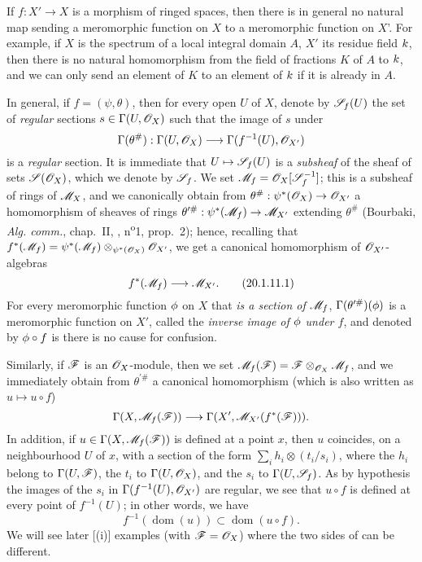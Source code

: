 \begin{env}[20.1.11]
\label{IV.20.1.11}
If $f:X'\to X$ is a morphism of ringed spaces, then there is in general no natural map sending a meromorphic function on $X$ to a meromorphic function on $X$'.
For example, if $X$ is the spectrum of a local integral domain $A$, $X'$ its residue field $k$, then there is no natural homomorphism from the field of fractions $K$ of $A$ to $k$, and we can only send an element of $K$ to an element of $k$ if it is already in $A$.

In general, if $f=(\psi,\theta)$, then for every open $U$ of $X$, denote by $\mathscr{S}_f(U)$ the set of \emph{regular} sections $s\in\Gamma(U,\mathscr{O}_X)$ such that the image of $s$ under
\[
  \Gamma(\theta^\#):\Gamma(U,\sh{O}_X)\to\Gamma(f^{-1}(U),\sh{O}_{X'})
\]
is a \emph{regular} section.
It is immediate that $U\mapsto\sh{S}_f(U)$ is a \emph{subsheaf} of the sheaf of sets $\mathscr{S}(\mathscr{O}_X)$, which we denote by $\mathscr{S}_f$.
We set $\mathscr{M}_f=\mathscr{O}_X[\mathscr{S}_f^{-1}]$;
this is a subsheaf
of rings of $\mathscr{M}_X$, and we canonically obtain from $\theta^\#:\psi^*(\sh{O}_X)\to\sh{O}_{X'}$ a homomorphism of sheaves of rings $\theta^{\prime\#}:\psi^*(\sh{M}_f)\to\sh{M}_{X'}$ extending $\theta^\#$ (Bourbaki, \emph{Alg. comm.}, chap.~II, , n\textsuperscript{o}1, prop.~2);
hence, recalling that $f^*(\mathscr{M}_f)=\psi^*(\mathscr{M}_f)\otimes_{\psi^*(\mathscr{O}_X)}\mathscr{O}_{X'}$,
we get a canonical homomorphism of $\mathscr{O}_{X'}$-algebras
\[
\label{IV.20.1.11.1}
  f^*(\sh{M}_f)\to\sh{M}_{X'}.
  \tag{20.1.11.1}
\]
For every meromorphic function $\phi$ on $X$ that \emph{is a section of $\mathscr{M}_f$}, $\Gamma(\theta^{\prime\#})(\phi)$ is a meromorphic function on $X'$, called the \emph{inverse image of $\phi$ under $f$}, and denoted by $\phi\circ f$ is there is no cause for confusion.

Similarly, if $\mathscr{F}$ is an $\mathscr{O}_X$-module, then we set $\mathscr{M}_f(\mathscr{F})=\mathscr{F}\otimes_{\mathscr{O}_X}\mathscr{M}_f$, and we immediately obtain from $\theta^{\prime\#}$ a canonical homomorphism (which is also written as $u\mapsto u\circ f$)
\[
  \Gamma(X,\sh{M}_f(\sh{F}))\to\Gamma(X',\sh{M}_{X'}(f^*(\sh{F}))).
\]
In addition, if $u\in\Gamma(X,\mathscr{M}_f(\mathscr{F}))$ is defined  at a point $x$, then $u$ coincides, on a neighbourhood $U$ of $x$, with a section of the form $\sum_i h_i\otimes(t_i/s_i)$, where the $h_i$ belong to $\Gamma(U,\mathscr{F})$, the $t_i$ to $\Gamma(U,\mathscr{O}_X)$, and the $s_i$ to $\Gamma(U,\mathscr{S}_f)$.
As by hypothesis the images of the $s_i$ in $\Gamma(f^{-1}(U),\mathscr{O}_{X'})$ are regular, we see that $u\circ f$ is defined at every point of $f^{-1}(U)$;
in other words, we have
\[
\label{IV.20.1.11.2}
  f^{-1}(\operatorname{dom}(u))\subset\operatorname{dom}(u\circ f).
  \tag{20.1.11.2}
\]
We will see later [(i)] examples (with $\mathscr{F}=\mathscr{O}_X$) where the two sides of  can be different.


\end{env}
